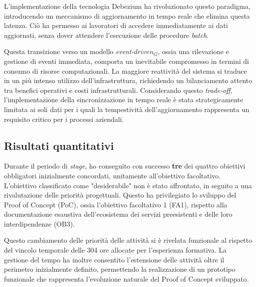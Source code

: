         \vspace{0.2 em}
        \noindent L'implementazione della tecnologia Debezium ha rivoluzionato questo paradigma, introducendo un meccanismo di aggiornamento in tempo reale che elimina questa latenza. Ciò ha permesso ai lavoratori di accedere immediatamente ai dati aggiornati, senza dover attendere l'esecuzione delle procedure \textit{batch}.

        \vspace{0.2 em}
        \noindent Questa transizione verso un modello \textit{event-$driven_G$}, ossia una rilevazione e gestione di eventi immediata, comporta un inevitabile compromesso in termini di consumo di risorse computazionali. La maggiore reattività del sistema si traduce in un più intenso utilizzo dell'infrastruttura, richiedendo un bilanciamento attento tra benefici operativi e costi infrastrutturali. Considerando questo \textit{trade-off}, l'implementazione della sincronizzazione in tempo reale è stata strategicamente limitata ai soli dati per i quali la tempestività dell'aggiornamento rappresenta un requisito critico per i processi aziendali.

        
        \subsection{Risultati quantitativi}
        Durante il periodo di \textit{stage}, ho conseguito con successo \textbf{tre} dei quattro obiettivi obbligatori inizialmente concordati, unitamente all'obiettivo facoltativo. L'obiettivo classificato come "desiderabile" non è stato affrontato, in seguito a una rivalutazione delle priorità progettuali. Questo ha privilegiato lo sviluppo del Proof of Concept (PoC), ossia l'obiettivo facoltativo 1 (FA1), rispetto alla documentazione esaustiva dell'ecosistema dei servizi preesistenti e delle loro interdipendenze (OB3).

        \vspace{0.2 em}
        \noindent Questo cambiamento delle priorità delle attività si è rivelata funzionale al rispetto del vincolo temporale delle 304 ore allocate per l'esperienza formativa. La gestione del tempo ha inoltre consentito l'estensione delle attività oltre il perimetro inizialmente definito, permettendo la realizzazione di un prototipo funzionale che rappresenta l'evoluzione naturale del Proof of Concept sviluppato.

